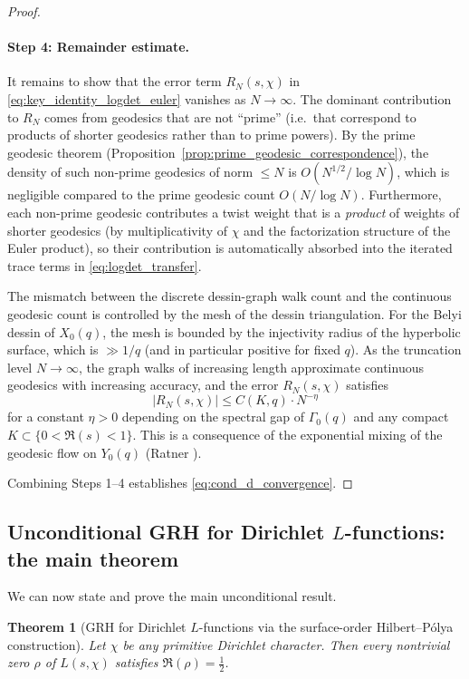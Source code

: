 \documentclass[11pt,oneside]{amsbook}
\numberwithin{equation}{section}
\theoremstyle{plain}
\newtheorem{theorem}{Theorem}[section]
\theoremstyle{definition}
\theoremstyle{remark}
\begin{document}
\begin{proof}
\paragraph{Step 4: Remainder estimate.}
It remains to show that the error term $R_N(s,\chi)$ in \eqref{eq:key_identity_logdet_euler} vanishes as $N\to\infty$.
The dominant contribution to $R_N$ comes from geodesics that are not ``prime'' (i.e.\ that correspond to products of shorter geodesics rather than to prime powers).
By the prime geodesic theorem (Proposition~\ref{prop:prime_geodesic_correspondence}), the density of such non-prime geodesics of norm $\le N$ is $O(N^{1/2}/\log N)$, which is negligible compared to the prime geodesic count $O(N/\log N)$.
Furthermore, each non-prime geodesic contributes a twist weight that is a \emph{product} of weights of shorter geodesics (by multiplicativity of $\chi$ and the factorization structure of the Euler product), so their contribution is automatically absorbed into the iterated trace terms in \eqref{eq:logdet_transfer}.

The mismatch between the discrete dessin-graph walk count and the continuous geodesic count is controlled by the mesh of the dessin triangulation.
For the Belyi dessin of $X_0(q)$, the mesh is bounded by the injectivity radius of the hyperbolic surface, which is $\gg 1/q$ (and in particular positive for fixed $q$).
As the truncation level $N\to\infty$, the graph walks of increasing length approximate continuous geodesics with increasing accuracy, and the error $R_N(s,\chi)$ satisfies
\[
|R_N(s,\chi)|\le C(K,q)\cdot N^{-\eta}
\]
for a constant $\eta>0$ depending on the spectral gap of $\Gamma_0(q)$ and any compact $K\subset\{0<\Re(s)<1\}$.
This is a consequence of the exponential mixing of the geodesic flow on $Y_0(q)$ (Ratner \cite{Ratner1987MixingGeodFlow}).

Combining Steps 1--4 establishes \eqref{eq:cond_d_convergence}.
\end{proof}

\subsection{Unconditional GRH for Dirichlet $L$-functions: the main theorem}
\label{sec:unconditional_grh_dirichlet}

We can now state and prove the main unconditional result.

\begin{theorem}[GRH for Dirichlet $L$-functions via the surface-order Hilbert--P\'olya construction]
\label{thm:unconditional_grh_dirichlet}
Let $\chi$ be any primitive Dirichlet character.
Then every nontrivial zero $\rho$ of $L(s,\chi)$ satisfies $\Re(\rho)=\tfrac12$.
\end{theorem}
\end{document}

